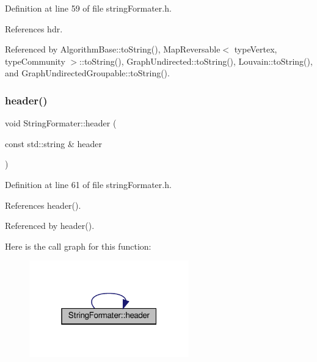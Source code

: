 Definition at line 59 of file string\+Formater.\+h.



References hdr.



Referenced by Algorithm\+Base\+::to\+String(), Map\+Reversable$<$ type\+Vertex, type\+Community $>$\+::to\+String(), Graph\+Undirected\+::to\+String(), Louvain\+::to\+String(), and Graph\+Undirected\+Groupable\+::to\+String().

\mbox{\label{classStringFormater_ac8c0d32e4249aadbcfada138760ac944}} 
\subsubsection{\texorpdfstring{header()}{header()}\hspace{0.1cm}{\footnotesize\ttfamily [2/2]}}
{\footnotesize\ttfamily void String\+Formater\+::header (\begin{DoxyParamCaption}\item[{const std\+::string \&}]{header }\end{DoxyParamCaption})\hspace{0.3cm}{\ttfamily [inline]}}



Definition at line 61 of file string\+Formater.\+h.



References header().



Referenced by header().

Here is the call graph for this function\+:
\nopagebreak
\begin{figure}[H]
\begin{center}
\leavevmode
\includegraphics[width=196pt]{classStringFormater_ac8c0d32e4249aadbcfada138760ac944_cgraph}
\end{center}
\end{figure}
\mbox{\label{classStringFormater_a8a4422bdcbe498401aecb283c433d31d}} 
